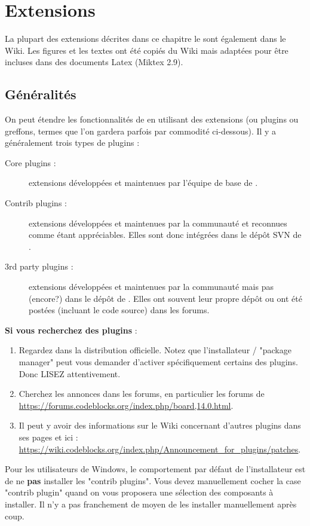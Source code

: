 \chapter{Extensions}\label{sec:plugins}

La plupart des extensions décrites dans ce chapitre le sont également dans le Wiki. Les figures et les textes ont été copiés du Wiki mais adaptées pour être incluses dans des documents Latex (Miktex 2.9). 

\section{Généralités}

On peut étendre les fonctionnalités de \codeblocks en utilisant des extensions (ou plugins ou greffons, termes que l'on gardera parfois par commodité ci-dessous). Il y a généralement trois types de plugins :
\begin{description}
\item[Core plugins :] extensions développées et maintenues par l'équipe de base de \codeblocks.
\item[Contrib plugins :] extensions développées et maintenues par la communauté et reconnues comme étant appréciables. Elles sont donc intégrées dans le dépôt SVN de \codeblocks.
\item[3rd party plugins :] extensions développées et maintenues par la communauté mais pas (encore?) dans le dépôt de \codeblocks. Elles ont souvent leur propre dépôt ou ont été postées (incluant le code source) dans les forums.
\end{description}

\textbf{Si vous recherchez des plugins} :
\begin{enumerate}
\item Regardez dans la distribution officielle. Notez que l'installateur / "package manager" peut vous demander d'activer spécifiquement certains des plugins. Donc LISEZ attentivement.
\item Cherchez les annonces dans les forums, en particulier les forums de \url{https://forums.codeblocks.org/index.php/board,14.0.html}.
\item Il peut y avoir des informations sur le Wiki concernant d'autres plugins dans ses pages et ici : \url{https://wiki.codeblocks.org/index.php/Announcement_for_plugins/patches}.
\end{enumerate}

Pour les utilisateurs de Windows, le comportement par défaut de l'installateur est de ne \textbf{pas} installer les "contrib plugins". Vous devez manuellement cocher la case "contrib plugin" quand on vous proposera une sélection des composants à installer. Il n'y a pas franchement de moyen de les installer manuellement après coup.


